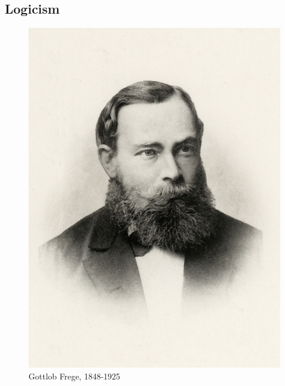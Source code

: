 \documentclass{article}
\begin{document}
\subsection{Logicism}

\begin{figure}
 \centering
 \includegraphics[scale=0.9]{img/Frege.jpg}
 \captionsetup{labelformat=empty}
 \caption{Gottlob Frege, 1848-1925}
 \label{fig:Frege}
\end{figure}

\end{document}
